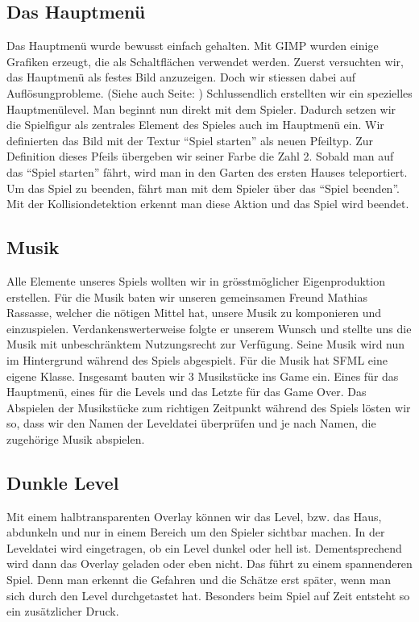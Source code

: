 \documentclass[11pt,a4paper]{scrbook}
\newcommand{\q}[1]{``#1''}
\begin{document}
\subsection{Das Hauptmenü}     
Das Hauptmenü wurde bewusst einfach gehalten. Mit GIMP wurden     
einige Grafiken erzeugt, die als Schaltflächen verwendet werden.
Zuerst versuchten wir, das Hauptmenü als festes Bild anzuzeigen. Doch wir stiessen dabei auf Auflösungprobleme. (Siehe auch Seite: \pageref{aufloesungsprobleme})
Schlussendlich erstellten wir ein spezielles Hauptmenülevel.
Man beginnt nun direkt mit dem Spieler.
Dadurch setzen wir die Spielfigur als zentrales Element des Spieles auch im Hauptmenü ein.
Wir definierten das Bild mit der Textur \q{Spiel starten} als neuen Pfeiltyp. 
Zur Definition dieses Pfeils übergeben wir seiner Farbe die Zahl 2. 
Sobald man auf das \q{Spiel starten} fährt, wird man in den Garten des ersten Hauses teleportiert. 
Um das Spiel zu beenden, fährt man mit dem Spieler über das \q{Spiel beenden}. Mit der Kollisiondetektion erkennt man diese Aktion und das Spiel wird beendet.

\subsection{Musik}     
Alle Elemente unseres Spiels wollten wir in grösstmöglicher Eigenproduktion erstellen. Für die Musik baten wir unseren gemeinsamen Freund Mathias Rassasse, welcher die nötigen Mittel hat, unsere Musik zu komponieren und einzuspielen. Verdankenswerterweise folgte er unserem Wunsch und stellte uns die Musik mit unbeschränktem Nutzungsrecht zur Verfügung. 
Seine Musik wird nun im Hintergrund während des Spiels abgespielt. 
Für die Musik hat SFML eine eigene Klasse. 
Insgesamt bauten wir 3 Musikstücke ins Game ein. 
Eines für das Hauptmenü, eines für die Levels und das Letzte für das Game Over. 
Das Abspielen der Musikstücke zum richtigen Zeitpunkt während des Spiels lösten wir so, dass wir den Namen der Leveldatei überprüfen und je nach Namen, die zugehörige Musik abspielen.
    
    
\subsection{Dunkle Level}     
Mit einem halbtransparenten Overlay können wir das Level, bzw. das Haus, abdunkeln und nur in einem Bereich um den Spieler sichtbar machen.
In der Leveldatei wird eingetragen, ob ein Level dunkel oder hell ist. Dementsprechend wird dann das Overlay geladen oder eben nicht. Das führt zu einem spannenderen Spiel. Denn man erkennt die Gefahren und die Schätze erst später, wenn man sich durch den Level durchgetastet hat.
Besonders beim Spiel auf Zeit entsteht so ein zusätzlicher Druck. 
\end{document}
